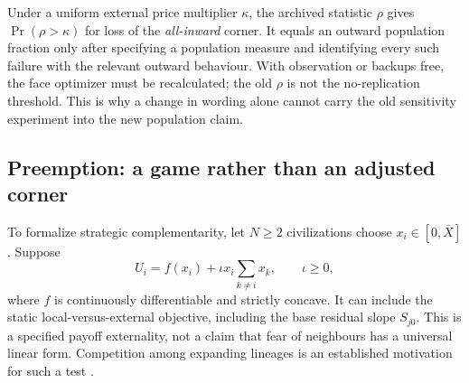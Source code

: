 Under a uniform external price multiplier $\kappa$, the archived statistic
$\rho$ gives $\Pr(\rho>\kappa)$ for loss of the \emph{all-inward} corner.
It equals an outward population fraction only after specifying a
population measure and identifying every such failure with the relevant
outward behaviour. With observation or backups free, the face optimizer
must be recalculated; the old $\rho$ is not the no-replication threshold.
This is why a change in wording alone cannot carry the old sensitivity
experiment into the new population claim.

\subsection{Preemption: a game rather than an adjusted corner}
To formalize strategic complementarity, let $N\geq2$ civilizations choose
$x_i\in[0,\bar X]$. Suppose
\begin{equation}
 U_i=f(x_i)+\iota x_i\sum_{k\ne i}x_k,
 \qquad \iota\geq0,
 \label{eq:preemption-game}
\end{equation}
where $f$ is continuously differentiable and strictly concave. It can
include the static local-versus-external objective, including the base
residual slope $S_{j0}$. This is a specified payoff externality, not a
claim that fear of neighbours has a universal linear form. Competition
among expanding lineages is an established motivation for such a test
\citep{Hanson1998}.

